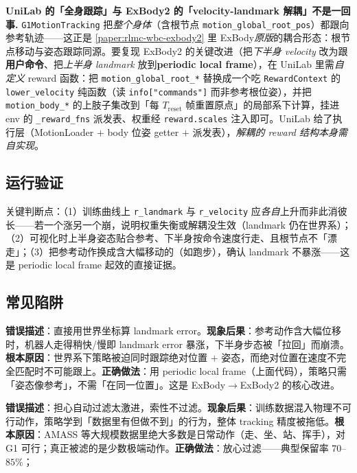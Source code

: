 \begin{note}
\textbf{UniLab 的「全身跟踪」与 ExBody2 的「velocity-landmark 解耦」不是一回事.}\;
\texttt{G1MotionTracking} 把\emph{整个身体}（含根节点 \verb|motion_global_root_pos|）都跟向参考轨迹——这正是 \cref{paper:rlmc-wbc-exbody2} 里 ExBody\emph{原版}的耦合形态：根节点移动与姿态跟踪同源。要复现 ExBody2 的关键改进（把\emph{下半身 velocity} 改为跟\textbf{用户命令}、把\emph{上半身 landmark} 放到\textbf{periodic local frame}），在 UniLab 里需\emph{自定义} reward 函数：把 \verb|motion_global_root_*| 替换成一个吃 \verb|RewardContext| 的 \verb|lower_velocity| 纯函数（读 \verb|info["commands"]| 而非参考根位姿），并把 \verb|motion_body_*| 的上肢子集改到「每 $T_{\mathrm{reset}}$ 帧重置原点」的局部系下计算，挂进 env 的 \verb|_reward_fns| 派发表、权重经 \verb|reward.scales| 注入即可。UniLab 给了执行层（MotionLoader $+$ body 位姿 getter $+$ 派发表），\emph{解耦的 reward 结构本身需自实现}\cite{unilab2026}。
\end{note}

\subsection{运行验证}
关键判断点：（1）训练曲线上 \verb|r_landmark| 与 \verb|r_velocity| 应\emph{各自}上升而非此消彼长——若一个涨另一个崩，说明权重失衡或解耦没生效（landmark 仍在世界系）；（2）可视化时上半身姿态贴合参考、下半身按命令速度行走、且根节点不「漂走」；（3）把参考动作换成含大幅移动的（如跑步），确认 landmark 不暴涨——这是 periodic local frame 起效的直接证据。

\subsection{常见陷阱}
\begin{pitfall}
\textbf{错误描述}：直接用世界坐标算 landmark error。\textbf{现象后果}：参考动作含大幅位移时，机器人走得稍快/慢即 landmark error 暴涨，下半身步态被「拉回」而崩溃。\textbf{根本原因}：世界系下策略被迫同时跟踪绝对位置 $+$ 姿态，而绝对位置在速度不完全匹配时不可能跟上。\textbf{正确做法}：用 periodic local frame（上面代码），策略只需「姿态像参考」，不需「在同一位置」。这是 ExBody$\to$ExBody2 的核心改进。
\end{pitfall}
\begin{pitfall}
\textbf{错误描述}：担心自动过滤太激进，索性不过滤。\textbf{现象后果}：训练数据混入物理不可行动作，策略学到「数据里有但做不到」的行为，整体 tracking 精度被拖低。\textbf{根本原因}：AMASS 等大规模数据里绝大多数是日常动作（走、坐、站、挥手），对 G1 可行；真正被滤的是少数极端动作。\textbf{正确做法}：放心过滤——典型保留率 $70$--$85\%$；
\end{pitfall}

